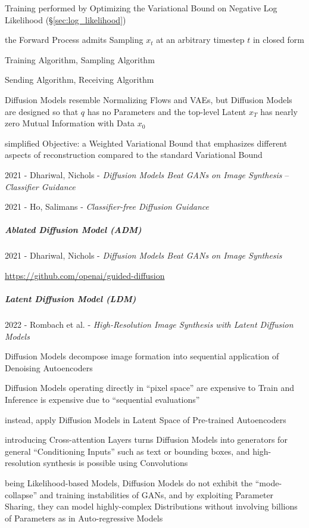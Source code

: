 Training performed by Optimizing the Variational Bound on Negative Log
Likelihood (\S\ref{sec:log_likelihood})

the Forward Process admits Sampling $x_t$ at an arbitrary timestep $t$ in closed
form

Training Algorithm, Sampling Algorithm

Sending Algorithm, Receiving Algorithm

Diffusion Models resemble Normalizing Flows and VAEs, but Diffusion Models are
designed so that $q$ has no Parameters and the top-level Latent $x_T$ has nearly
zero Mutual Information with Data $x_0$

simplified Objective: a Weighted Variational Bound that emphasizes different
aspects of reconstruction compared to the standard Variational Bound

2021 - Dhariwal, Nichols - \emph{Diffusion Models Beat GANs on Image Synthesis}
-- \emph{Classifier Guidance}

2021 - Ho, Salimans - \emph{Classifier-free Diffusion Guidance}



\subparagraph{Ablated Diffusion Model (ADM)}\label{sec:adm}\hfill

2021 - Dhariwal, Nichols - \emph{Diffusion Models Beat GANs on Image Synthesis}

\url{https://github.com/openai/guided-diffusion}



\subparagraph{Latent Diffusion Model (LDM)}\label{sec:ldm}\hfill

2022 - Rombach et al. -
\emph{High-Resolution Image Synthesis with Latent Diffusion Models}

Diffusion Models decompose image formation into sequential application of
Denoising Autoencoders

Diffusion Models operating directly in ``pixel space'' are expensive to Train
and Inference is expensive due to ``sequential evaluations''

instead, apply Diffusion Models in Latent Space of Pre-trained Autoencoders

introducing Cross-attention Layers turns Diffusion Models into generators for
general ``Conditioning Inputs'' such as text or bounding boxes, and
high-resolution synthesis is possible using Convolutions

being Likelihood-based Models, Diffusion Models do not exhibit the
``mode-collapse'' and training instabilities of GANs, and by exploiting
Parameter Sharing, they can model highly-complex Distributions without involving
billions of Parameters as in Auto-regressive Models

